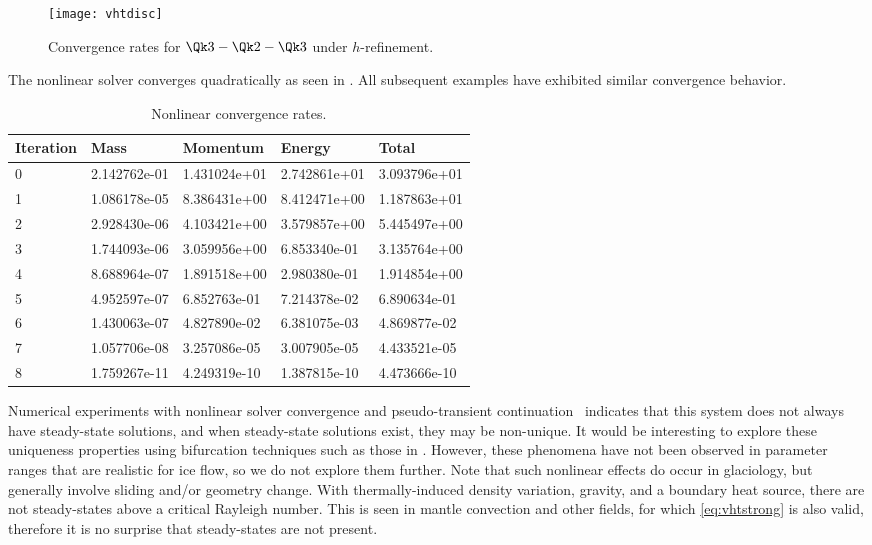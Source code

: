 \begin{figure}
  \centering\texttt{[image: vhtdisc]}
  \caption{Convergence rates for $\Qk 3 - \Qk 2 - \Qk 3$ under $h$-refinement.}\label{fig:vhtrefine}
\end{figure}

The nonlinear solver converges quadratically as seen in .
All subsequent examples have exhibited similar convergence behavior.
\begin{table}
  \centering
  \begin{tabular}{lllll}
    \toprule
    Iteration & Mass         & Momentum     & Energy       & Total        \\
    \midrule
    0         & 2.142762e-01 & 1.431024e+01 & 2.742861e+01 & 3.093796e+01 \\
    1         & 1.086178e-05 & 8.386431e+00 & 8.412471e+00 & 1.187863e+01 \\
    2         & 2.928430e-06 & 4.103421e+00 & 3.579857e+00 & 5.445497e+00 \\
    3         & 1.744093e-06 & 3.059956e+00 & 6.853340e-01 & 3.135764e+00 \\
    4         & 8.688964e-07 & 1.891518e+00 & 2.980380e-01 & 1.914854e+00 \\
    5         & 4.952597e-07 & 6.852763e-01 & 7.214378e-02 & 6.890634e-01 \\
    6         & 1.430063e-07 & 4.827890e-02 & 6.381075e-03 & 4.869877e-02 \\
    7         & 1.057706e-08 & 3.257086e-05 & 3.007905e-05 & 4.433521e-05 \\
    8         & 1.759267e-11 & 4.249319e-10 & 1.387815e-10 & 4.473666e-10 \\
    \bottomrule
  \end{tabular}
  \caption{Nonlinear convergence rates.}\label{tab:vhtsnes}
\end{table}

Numerical experiments with nonlinear solver convergence and pseudo-transient continuation~\citep{coffey2003ptc,kelley1998cap} indicates that this system does not always have steady-state solutions, and when steady-state solutions exist, they may be non-unique.
It would be interesting to explore these uniqueness properties using bifurcation techniques such as those in \citet{allgower2003inc}.
However, these phenomena have not been observed in parameter ranges that are realistic for ice flow, so we do not explore them further.
Note that such nonlinear effects do occur in glaciology, but generally involve sliding and/or geometry change.
With thermally-induced density variation, gravity, and a boundary heat source, there are not steady-states above a critical Rayleigh number.
This is seen in mantle convection and other fields, for which \eqref{eq:vhtstrong} is also valid, therefore it is no surprise that steady-states are not present.

